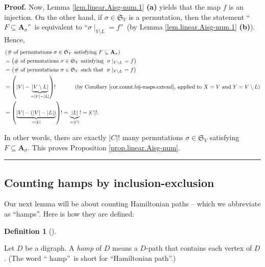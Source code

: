 \documentclass[numbers=enddot,12pt,final,onecolumn,notitlepage]{scrartcl}%
\numberwithin{exer}{section}
\theoremstyle{definition}
\newtheorem{defi}[theo]{Definition}
\newenvironment{definition}[1][]
{\begin{defi}[#1]\begin{leftbar}}
{\end{leftbar}\end{defi}}
\newenvironment{proof}[1][Proof]{\noindent\textbf{#1.} }{\ \rule{0.5em}{0.5em}}
\newenvironment{verlong}{}{}
\begin{document}
\begin{verlong}
\begin{proof}
Now, Lemma \ref{lem.linear.Aisg-num.1} \textbf{(a)} yields that the map $f$ is
an injection. On the other hand, if $\sigma\in\mathfrak{S}_{V}$ is a
permutation, then the statement \textquotedblleft$F\subseteq\mathbf{A}%
_{\sigma}$\textquotedblright\ is equivalent to \textquotedblleft$\left.
\sigma\mid_{V\setminus L}\right.  =f$\textquotedblright\ (by Lemma
\ref{lem.linear.Aisg-num.1} \textbf{(b)}). Hence,%
\begin{align*}
&  \left(  \text{\# of permutations }\sigma\in\mathfrak{S}_{V}\text{
satisfying }F\subseteq\mathbf{A}_{\sigma}\right) \\
&  =\left(  \text{\# of permutations }\sigma\in\mathfrak{S}_{V}\text{
satisfying }\left.  \sigma\mid_{V\setminus L}\right.  =f\right) \\
&  =\left(  \text{\# of permutations }\sigma\in\mathfrak{S}_{V}\text{ such
that }\left.  \sigma\mid_{V\setminus L}\right.  =f\right) \\
&  =\left(  \left\vert V\right\vert -\underbrace{\left\vert V\setminus
L\right\vert }_{=\left\vert V\right\vert -\left\vert L\right\vert }\right)
!\ \ \ \ \ \ \ \ \ \ \left(  \text{by Corollary
\ref{cor.count.bij-maps.extend}, applied to }X=V\text{ and }Y=V\setminus
L\right) \\
&  =\left(  \underbrace{\left\vert V\right\vert -\left(  \left\vert
V\right\vert -\left\vert L\right\vert \right)  }_{=\left\vert L\right\vert
}\right)  !=\underbrace{\left\vert L\right\vert }_{=\left\vert C\right\vert
}!=\left\vert C\right\vert !.
\end{align*}


In other words, there are exactly $\left\vert C\right\vert !$ many
permutations $\sigma\in\mathfrak{S}_{V}$ satisfying $F\subseteq\mathbf{A}%
_{\sigma}$. This proves Proposition \ref{prop.linear.Aisg-num}.
\end{proof}
\end{verlong}

\subsection{Counting hamps by inclusion-exclusion}

Our next lemma will be about counting Hamiltonian paths -- which we abbreviate
as \textquotedblleft hamps\textquotedblright. Here is how they are defined:

\begin{definition}
\label{def.hamp}Let $D$ be a digraph. A \emph{hamp} of $D$ means a $D$-path
that contains each vertex of $D$. (The word \textquotedblleft
hamp\textquotedblright\ is short for \textquotedblleft Hamiltonian
path\textquotedblright.)
\end{definition}
\end{document}
